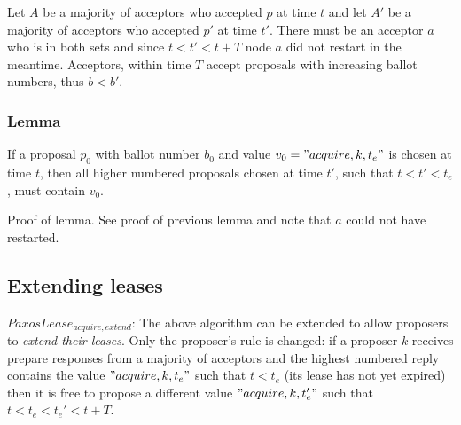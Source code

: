 \documentclass[12pt]{article}
\begin{document}
Let $A$ be a majority of acceptors who accepted $p$ at time $t$ and let $A'$ be a majority of acceptors who accepted $p'$ at time $t'$.  There must be an acceptor $a$ who is in both sets and since $t < t' < t + T$ node $a$ did not restart in the meantime. Acceptors, within time $T$ accept proposals with increasing ballot numbers, thus $b < b'$.

\subsubsection{ Lemma } If a proposal $p_0$ with ballot number $b_0$ and value $v_0 = "acquire, k, t_e"$ is chosen at time $t$, then all higher numbered proposals chosen at time $t'$, such that $t < t' < t_e$, must contain $v_0$.

Proof of lemma. See proof of previous lemma and note that $a$ could not have restarted.


\subsection{ Extending leases }

$PaxosLease_{acquire, extend}$: The above algorithm can be extended to allow proposers to \emph{extend their leases}. Only the proposer's rule is changed: if a proposer $k$ receives prepare responses from a majority of acceptors and the highest numbered reply contains the value $"acquire, k, t_e"$ such that $t < t_e$ (its lease has not yet expired) then it is free to propose a different value $"acquire, k, t_e'"$ such that $t < t_e < t_e' < t + T$.
\end{document}

